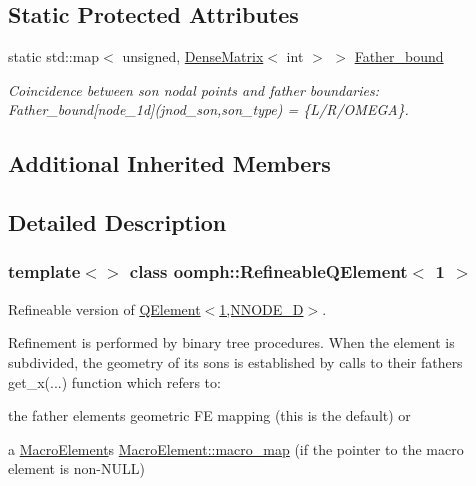 \subsection*{Static Protected Attributes}
\begin{DoxyCompactItemize}
\item 
static std\+::map$<$ unsigned, \hyperlink{classoomph_1_1DenseMatrix}{Dense\+Matrix}$<$ int $>$ $>$ \hyperlink{classoomph_1_1RefineableQElement_3_011_01_4_a48915986c094b8e6bbf3c92b8528eb1b}{Father\+\_\+bound}
\begin{DoxyCompactList}\small\item\em Coincidence between son nodal points and father boundaries\+: Father\+\_\+bound\mbox{[}node\+\_\+1d\mbox{]}(jnod\+\_\+son,son\+\_\+type) = \{L/\+R/\+O\+M\+E\+GA\}. \end{DoxyCompactList}\end{DoxyCompactItemize}
\subsection*{Additional Inherited Members}


\subsection{Detailed Description}
\subsubsection*{template$<$$>$\newline
class oomph\+::\+Refineable\+Q\+Element$<$ 1 $>$}

Refineable version of \hyperlink{classoomph_1_1QElement_3_011_00_01NNODE__1D_01_4}{Q\+Element$<$1,\+N\+N\+O\+D\+E\+\_\+D$>$}.

Refinement is performed by binary tree procedures. When the element is subdivided, the geometry of its sons is established by calls to their father\textquotesingle{}s {\ttfamily get\+\_\+x}(...) function which refers to\+:
\begin{DoxyItemize}
\item the father element\textquotesingle{}s geometric FE mapping (this is the default) or
\item a \hyperlink{classoomph_1_1MacroElement}{Macro\+Element}\textquotesingle{}s \hyperlink{classoomph_1_1MacroElement_a85e7842ad949bb4062a9ff302fa452e5}{Macro\+Element\+::macro\+\_\+map} (if the pointer to the macro element is non-\/\+N\+U\+LL)
\end{DoxyItemize}

